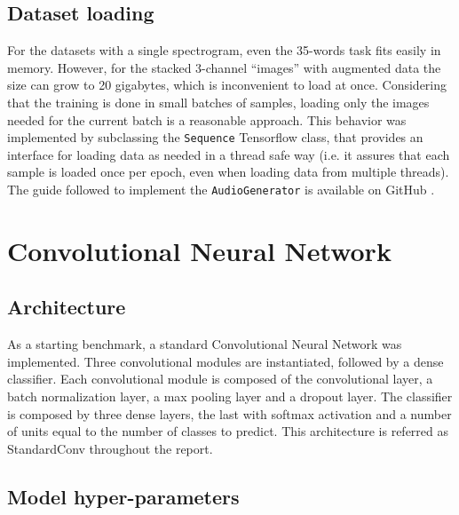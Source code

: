
\subsection{Dataset loading}

For the datasets with a single spectrogram, even the 35-words task fits easily
in memory. However, for the stacked 3-channel ``images'' with augmented data
the size can grow to 20 gigabytes, which is inconvenient to load at once.
Considering that the training is done in small batches of samples, loading only
the images needed for the current batch is a reasonable approach.
%
This behavior was implemented by subclassing the \texttt{Sequence} Tensorflow
class, that provides an interface for loading data as needed in a thread safe
way (i.e. it assures that each sample is loaded once per epoch, even when
loading data from multiple threads).
%
The guide followed to implement the \texttt{AudioGenerator} is available on
GitHub \cite{afshineaKDG}.

\section{Convolutional Neural Network}
\label{sec:convolutional_arch}

\subsection{Architecture}

As a starting benchmark, a standard Convolutional Neural Network was
implemented.
%
Three convolutional modules are instantiated, followed by a dense classifier.
%
Each convolutional module is composed of the convolutional layer, a batch
normalization layer, a max pooling layer and a dropout layer.
%
The classifier is composed by three dense layers, the last with softmax
activation and a number of units equal to the number of classes to predict.
%
This architecture is referred as StandardConv throughout the report.

\subsection{Model hyper-parameters}

